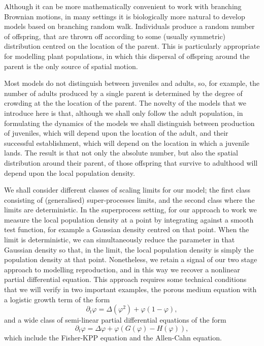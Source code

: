 \documentclass[12pt]{article}
\begin{document}
Although it can be more mathematically convenient to work with branching
Brownian motions, in many settings it is biologically more natural to 
develop models based on branching random walk.  
Individuals produce a random number of offspring,
that are thrown off according to some (usually symmetric) 
distribution centred on the location of the parent.   
This is particularly appropriate for modelling plant populations, in which
this dispersal of offspring around the parent is the only source of
spatial motion.


Most models do not distinguish between juveniles and adults, so,
for example, the number of adults produced by a single parent is determined
by the degree of crowding at the the location of the parent. The novelty
of the models that we introduce here is that, although we shall only
follow the adult population, in formulating the dynamics of the
models we shall distinguish
between production of juveniles, which will depend upon the location of 
the adult, and their successful establishment, which will depend on the
location in which a juvenile lands. The result is that not only the absolute 
number, but also the spatial distribution
around their parent, 
of those offspring that survive to adulthood
will depend upon the local population 
density. 


We shall consider different classes of scaling limits for our model; the first class consisting of
(generalised) super-processes limits, and the second class where the limits are deterministic. In the
superprocess setting, for our approach to work we measure the local population
density at a point by integrating against a smooth test function, for example 
a Gaussian density centred on that point.  
When the limit is deterministic,
we can simultaneously reduce the parameter in that Gaussian density so that,
in the limit, the local population density is simply the population density 
at that point. Nonetheless, we retain a signal of our two stage approach
to modelling reproduction, and  
in this way we recover a nonlinear partial differential equation. 
This approach requires some technical conditions that we will verify in two important examples,
the porous medium equation with a logistic growth term of the form 
$$\partial_t \varphi = \Delta (\varphi^2)+\varphi(1-\varphi),$$
and a wide class of semi-linear partial differential equations of the form 
$$\partial_t \varphi = \Delta\varphi+ \varphi \left(G(\varphi)-H(\varphi)\right),$$
which include the Fisher-KPP equation and the Allen-Cahn equation.
\end{document}
